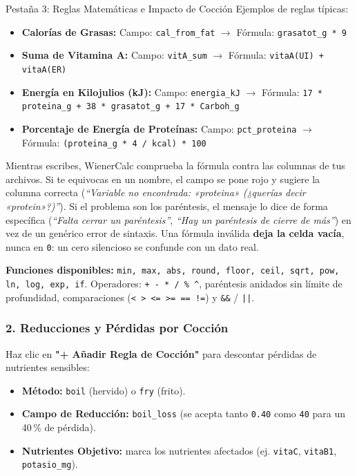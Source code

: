 \documentclass[11pt,a4paper]{article}
\begin{document}
\begin{stepcard}{Pestaña 3: Reglas Matemáticas e Impacto de Cocción}
Ejemplos de reglas típicas:
\begin{itemize}
    \item \textbf{Calorías de Grasas:} Campo: \texttt{cal\_from\_fat} $\rightarrow$ Fórmula: \texttt{grasatot\_g * 9}
    \item \textbf{Suma de Vitamina A:} Campo: \texttt{vitA\_sum} $\rightarrow$ Fórmula: \texttt{vitaA(UI) + vitaA(ER)}
    \item \textbf{Energía en Kilojulios (kJ):} Campo: \texttt{energia\_kJ} $\rightarrow$ Fórmula: \texttt{17 * proteina\_g + 38 * grasatot\_g + 17 * Carboh\_g}
    \item \textbf{Porcentaje de Energía de Proteínas:} Campo: \texttt{pct\_proteina} $\rightarrow$ Fórmula: \texttt{(proteina\_g * 4 / kcal) * 100}
\end{itemize}

\begin{tipbox}
Mientras escribes, WienerCalc comprueba la fórmula contra las columnas de tus archivos. Si te equivocas en un nombre, el campo se pone rojo y sugiere la columna correcta (\textit{``Variable no encontrada: «proteina» (¿querías decir «protein»?)''}). Si el problema son los paréntesis, el mensaje lo dice de forma específica (\textit{``Falta cerrar un paréntesis''}, \textit{``Hay un paréntesis de cierre de más''}) en vez de un genérico error de sintaxis. Una fórmula inválida \textbf{deja la celda vacía}, nunca en \texttt{0}: un cero silencioso se confunde con un dato real.

\textbf{Funciones disponibles:} \texttt{min, max, abs, round, floor, ceil, sqrt, pow, ln, log, exp, if}. Operadores: \texttt{+ - * / \% \^{}}, paréntesis anidados sin límite de profundidad, comparaciones (\texttt{< > <= >= == !=}) y \texttt{\&\&} / \texttt{||}.
\end{tipbox}

\subsubsection*{2. Reducciones y Pérdidas por Cocción}
Haz clic en \textbf{"+ Añadir Regla de Cocción"} para descontar pérdidas de nutrientes sensibles:
\begin{itemize}
    \item \textbf{Método:} \texttt{boil} (hervido) o \texttt{fry} (frito).
    \item \textbf{Campo de Reducción:} \texttt{boil\_loss} (se acepta tanto \texttt{0.40} como \texttt{40} para un 40\,\% de pérdida).
    \item \textbf{Nutrientes Objetivo:} marca los nutrientes afectados (ej. \texttt{vitaC}, \texttt{vitaB1}, \texttt{potasio\_mg}).
\end{itemize}
\end{stepcard}
\end{document}

